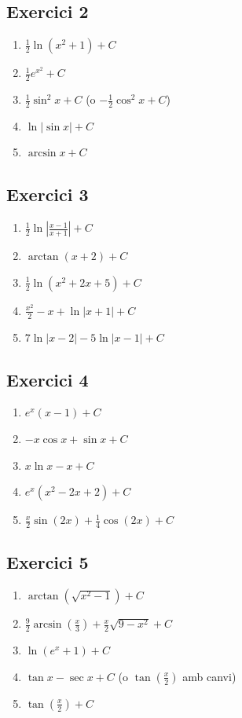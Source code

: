 \documentclass[12pt]{article}
\begin{document}
\subsection*{Exercici 2}
\begin{enumerate}[label=\alph*)]
    \item $\frac{1}{2}\ln(x^2+1)+C$
    \item $\frac{1}{2}e^{x^2}+C$
    \item $\frac{1}{2}\sin^2 x+C$ (o $-\frac{1}{2}\cos^2 x+C$)
    \item $\ln|\sin x|+C$
    \item $\arcsin x+C$
\end{enumerate}

\subsection*{Exercici 3}
\begin{enumerate}[label=\alph*)]
    \item $\frac{1}{2}\ln\left|\frac{x-1}{x+1}\right|+C$
    \item $\arctan(x+2)+C$
    \item $\frac{1}{2}\ln(x^2+2x+5)+C$
    \item $\frac{x^2}{2}-x+\ln|x+1|+C$
    \item $7\ln|x-2|-5\ln|x-1|+C$
\end{enumerate}

\subsection*{Exercici 4}
\begin{enumerate}[label=\alph*)]
    \item $e^x(x-1)+C$
    \item $-x\cos x+\sin x+C$
    \item $x\ln x-x+C$
    \item $e^x(x^2-2x+2)+C$
    \item $\frac{x}{2}\sin(2x)+\frac{1}{4}\cos(2x)+C$
\end{enumerate}

\subsection*{Exercici 5}
\begin{enumerate}[label=\alph*)]
    \item $\arctan(\sqrt{x^2-1})+C$
    \item $\frac{9}{2}\arcsin\left(\frac{x}{3}\right)+\frac{x}{2}\sqrt{9-x^2}+C$
    \item $\ln(e^x+1)+C$
    \item $\tan x-\sec x+C$ (o $\tan\left(\frac{x}{2}\right)$ amb canvi)
    \item $\tan\left(\frac{x}{2}\right)+C$
\end{enumerate}
\end{document}

